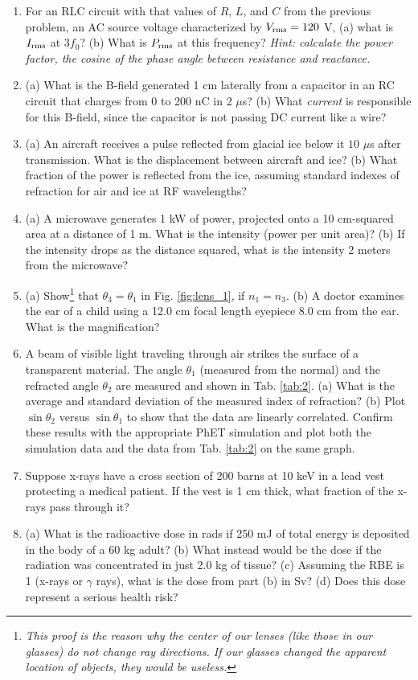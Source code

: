 \documentclass[12pt,twocolumn]{article}
\begin{document}
\begin{enumerate}
\item For an RLC circuit with that values of $R$, $L$, and $C$ from the previous problem, an AC source voltage characterized by $V_{\rm rms} = 120$ V, (a) what is $I_{\rm rms}$ at $3 f_0$? (b) What is $P_{\rm rms}$ at this frequency? \textit{Hint: calculate the power factor, the cosine of the phase angle between resistance and reactance.}
\item (a) What is the B-field generated 1 cm laterally from a capacitor in an RC circuit that charges from 0 to 200 nC in 2 $\mu$s? (b) What \textit{current} is responsible for this B-field, since the capacitor is not passing DC current like a wire?
\item (a) An aircraft receives a pulse reflected from glacial ice below it $10$ $\mu$s after transmission. What is the displacement between aircraft and ice? (b) What fraction of the power is reflected from the ice, assuming standard indexes of refraction for air and ice at RF wavelengths?
\item (a) A microwave generates 1 kW of power, projected onto a 10 cm-squared area at a distance of 1 m.  What is the intensity (power per unit area)? (b) If the intensity drops as the distance squared, what is the intensity 2 meters from the microwave?
\item (a) Show\footnote{\textit{This proof is the reason why the center of our lenses (like those in our glasses) do not change ray directions.  If our glasses changed the apparent location of objects, they would be useless.}} that $\theta_3 = \theta_1$ in Fig. \ref{fig:lens_1}, if $n_1 = n_3$. (b) A doctor examines the ear of a child using a 12.0 cm focal length eyepiece 8.0 cm from the ear. What is the magnification?
\item A beam of visible light traveling through air strikes the surface of a transparent material. 
The angle $\theta_1$ (measured from the normal) and the refracted angle $\theta_2$ are measured and shown in Tab. \ref{tab:2}.  (a) What is the average and standard deviation of the measured index of refraction? (b) Plot $\sin\theta_2$ versus $\sin\theta_1$ to show that the data are linearly correlated.  Confirm these results with the appropriate PhET simulation and plot both the simulation data and the data from Tab. \ref{tab:2} on the same graph.
\item Suppose x-rays have a cross section of 200 barns at 10 keV in a lead vest protecting a medical patient.  If the vest is 1 cm thick, what fraction of the x-rays pass through it?
\item (a) What is the radioactive dose in rads if 250 mJ of total energy is deposited in the body of a 60 kg adult? (b) What instead would be the dose if the radiation was concentrated in just 2.0 kg of tissue? (c) Assuming the RBE is 1 (x-rays or $\gamma$ rays), what is the dose from part (b) in Sv? (d) Does this dose represent a serious health risk?


\end{enumerate}
\end{document}
